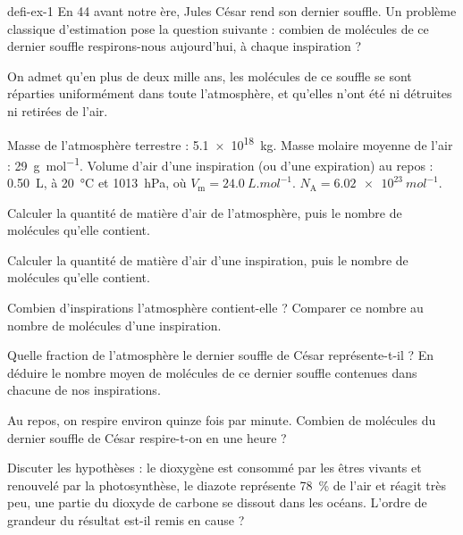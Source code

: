 \begin{blocEdition}{defi-ex-1}
En 44 avant notre ère, Jules César rend son dernier souffle. Un problème classique d'estimation pose la question
suivante : combien de molécules de ce dernier souffle respirons-nous aujourd'hui, à chaque inspiration ?\par\smallskip
On admet qu'en plus de deux mille ans, les molécules de ce souffle se sont réparties uniformément dans toute
l'atmosphère, et qu'elles n'ont été ni détruites ni retirées de l'air.
\begin{donnees}
Masse de l'atmosphère terrestre : \qty{5,1e18}{kg}. Masse molaire moyenne de l'air : \qty{29}{g.mol^{-1}}. Volume d'air d'une
inspiration (ou d'une expiration) au repos : \qty{0,50}{L}, à \qty{20}{\degreeCelsius} et \qty{1013}{hPa}, où $V_\mathrm{m}=\qty{24,0}{L.mol^{-1}}$.
$N_\mathrm{A}=\qty{6,02e23}{mol^{-1}}$.
\end{donnees}
\begin{questions}
\item Calculer la quantité de matière d'air de l'atmosphère, puis le nombre de molécules qu'elle contient.
\item Calculer la quantité de matière d'air d'une inspiration, puis le nombre de molécules qu'elle contient.
\item Combien d'inspirations l'atmosphère contient-elle ? Comparer ce nombre au nombre de molécules d'une inspiration.
\item Quelle fraction de l'atmosphère le dernier souffle de César représente-t-il ? En déduire le nombre moyen de
molécules de ce dernier souffle contenues dans chacune de nos inspirations.
\item Au repos, on respire environ quinze fois par minute. Combien de molécules du dernier souffle de César
respire-t-on en une heure ?
\item Discuter les hypothèses : le dioxygène est consommé par les êtres vivants et renouvelé par la photosynthèse, le
diazote représente 78~\% de l'air et réagit très peu, une partie du dioxyde de carbone se dissout dans les océans.
L'ordre de grandeur du résultat est-il remis en cause ?
\end{questions}
\end{blocEdition}

